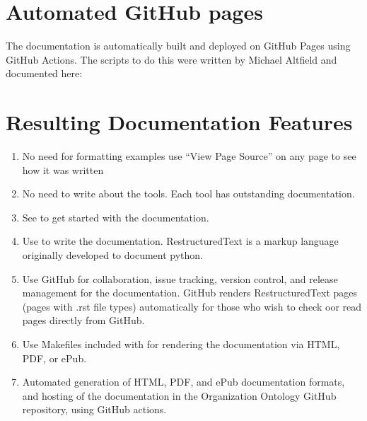 \documentclass[letterpaper,10pt,english]{sphinxmanual}
\begin{document}
\section{Automated GitHub pages}
\label{\detokenize{documentation-authors:automated-github-pages}}
\sphinxAtStartPar
The documentation is automatically built and deployed on GitHub Pages using GitHub
Actions.  The scripts to do this were written by Michael Altfield and
documented here: 


\section{Resulting Documentation Features}
\label{\detokenize{documentation-authors:resulting-documentation-features}}\begin{enumerate}
%
\item {} 
\sphinxAtStartPar
No need for formatting examples \textendash{} use “View Page Source” on any page to see how it
was written

\item {} 
\sphinxAtStartPar
No need to write about the tools.  Each tool has outstanding documentation.

\item {} 
\sphinxAtStartPar
See
to get
started with the documentation.

\item {} 
\sphinxAtStartPar
Use  to
write the documentation.  RestructuredText is a mark\sphinxhyphen{}up language originally developed
to document python.

\item {} 
\sphinxAtStartPar
Use GitHub for collaboration, issue tracking, version control, and release
management for
the documentation.  GitHub renders RestructuredText pages (pages with .rst
file types) automatically for those who wish to check oor read pages directly from
GitHub.

\item {} 
\sphinxAtStartPar
Use Makefiles included with  for rendering
the documentation via HTML, PDF, or ePub.

\item {} 
\sphinxAtStartPar
Automated generation of HTML, PDF, and ePub documentation formats, and hosting of
the documentation in the Organization Ontology GitHub repository, using GitHub
actions.

\end{enumerate}
\end{document}
